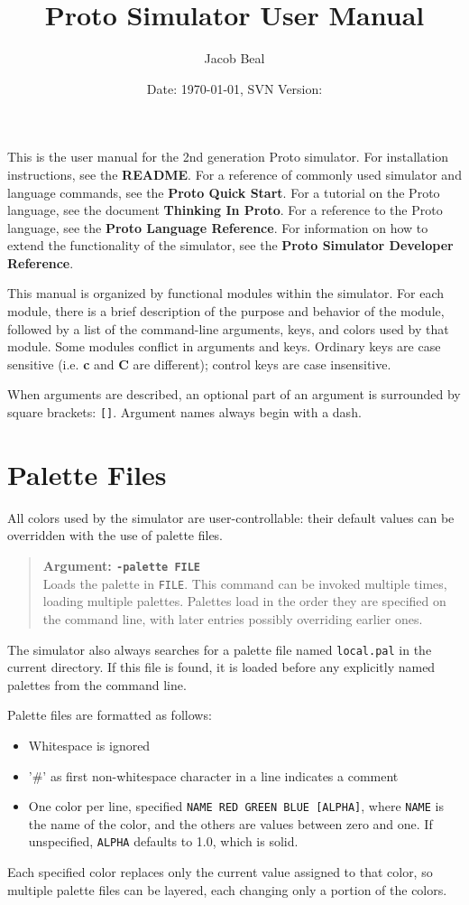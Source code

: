 \documentclass{article}
\title{Proto Simulator User Manual}
\author{Jacob Beal}
\date{Date: \today, SVN Version: \svnrev{}}
\newcommand\var[1]{{\tt #1}}
\newcommand\key[1]{{\bf #1}}
\newcommand\simarg[2]{\begin{quote} {\bf Argument: \var{#1}} \\ #2 \end{quote}}
\begin{document}
\maketitle

This is the user manual for the 2nd generation Proto simulator.  For
installation instructions, see the {\bf README}.  For
a reference of commonly used simulator and language commands, see the
{\bf Proto Quick Start}.  For a tutorial on the Proto language, see
the document {\bf Thinking In Proto}.  For a reference to the Proto
language, see the {\bf Proto Language Reference}.  For information on
how to extend the functionality of the simulator, see the {\bf Proto
Simulator Developer Reference}.

This manual is organized by functional modules within the simulator.
For each module, there is a brief description of the purpose and
behavior of the module, followed by a list of the command-line
arguments, keys, and colors used by that module.  Some modules
conflict in arguments and keys.  Ordinary keys are case sensitive
(i.e.  \key{c} and \key{C} are different); control keys are case
insensitive.

When arguments are described, an optional part of an argument is
surrounded by square brackets: \var{[]}.  Argument names always begin
with a dash.





\section{Palette Files}

All colors used by the simulator are user-controllable: their default
values can be overridden with the use of palette files.

\simarg{-palette FILE}{Loads the palette in \var{FILE}.  This
command can be invoked multiple times, loading multiple palettes.
Palettes load in the order they are specified on the command line,
with later entries possibly overriding earlier ones.}

The simulator also always searches for a palette file named
\var{local.pal} in the current directory.  If this file is found, it
is loaded before any explicitly named palettes from the command line.

Palette files are formatted as follows:
\begin{itemize}
\item Whitespace is ignored
\item '\#' as first non-whitespace character in a line indicates a comment
\item One color per line, specified \var{NAME RED GREEN BLUE [ALPHA]},
      where \var{NAME} is the name of the color, and the others are
      values between zero and one.  If unspecified, \var{ALPHA} defaults
      to 1.0, which is solid.
\end{itemize}
Each specified color replaces only the current value assigned to that
color, so multiple palette files can be layered, each changing only a
portion of the colors.
\end{document}

